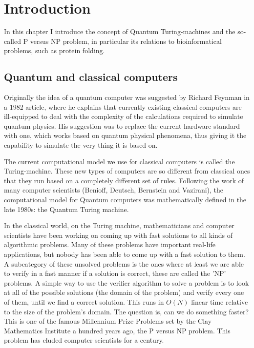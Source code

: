 \chapter{Introduction}

In this chapter I introduce the concept of Quantum Turing-machines and the so-called P versus NP problem, in particular its relations to bioinformatical problems, such as protein folding.

\section{Quantum and classical computers}

Originally the idea of a quantum computer was suggested by Richard Feynman in a 1982 article\cite{feynman_simulating_1982}, where he explains that currently existing classical computers are ill-equipped to deal with the complexity of the calculations required to simulate quantum physics. His suggestion was to replace the current hardware standard with one, which works based on quantum physical phenomena, thus giving it the capability to simulate the very thing it is based on.

The current computational model we use for classical computers is called the Turing-machine. These new types of computers are so different from classical ones that they run based on a completely different set of rules. Following the work of many computer scientists (Benioff, Deutsch, Bernstein and Vazirani), the computational model for Quantum computers was mathematically defined in the late 1980s: the Quantum Turing machine.

In the classical world, on the Turing machine, mathematicians and computer scientists have been working on coming up with fast solutions to all kinds of algorithmic problems. Many of these problems have important real-life applications, but nobody has been able to come up with a fast solution to them. A subcategory of these unsolved problems is the ones where at least we are able to verify in a fast manner if a solution is correct, these are called the 'NP' problems. A simple way to use the verifier algorithm to solve a problem is to look at all of the possible solutions (the domain of the problem) and verify every one of them, until we find a correct solution. This runs in $O(N)$ linear time relative to the size of the problem's domain. The question is, can we do something faster? This is one of the famous Millennium Prize Problems set by the Clay Mathematics Institute a hundred years ago, the P versus NP problem. This problem has eluded computer scientists for a century.

